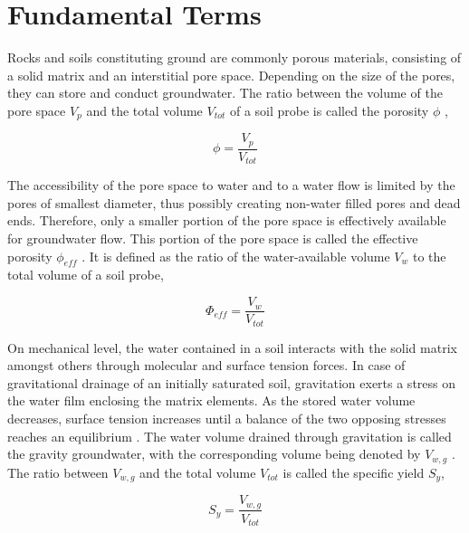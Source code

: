 


\section{Fundamental Terms}
\label{Sec-TheoFundTerms}

Rocks and soils constituting ground are commonly porous materials, consisting of a solid matrix and an interstitial pore space. 
Depending on the size of the pores, they can store and conduct groundwater. 
The ratio between the volume of the pore space $V_p$ and the total volume $V_{tot}$ of a soil probe is called the porosity $\phi$ \parencite{Fetter.2001},

\begin{equation}
    \label{Eq-Porosity}
    \phi = \frac{V_p}{V_{tot}}
\end{equation}

The accessibility of the pore space to water and to a water flow is limited by the pores of smallest diameter, thus possibly creating non-water filled pores and dead ends. 
Therefore, only a smaller portion of the pore space is effectively available for groundwater flow. 
This portion of the pore space is called the effective porosity $\phi_{eff}$ \parencite{Fetter.2001}. 
It is defined as the ratio of the water-available volume $V_w$ to the total volume of a soil probe,

\begin{equation}
    \label{Eq-PorEff}
    \Phi_{eff} = \frac{V_w}{V_{tot}}
\end{equation}

On mechanical level, the water contained in a soil interacts with the solid matrix amongst others through molecular and surface tension forces. 
In case of gravitational drainage of an initially saturated soil, gravitation exerts a stress on the water film enclosing the matrix elements. 
As the stored water volume decreases, surface tension increases until a balance of the two opposing stresses reaches an equilibrium \parencite{Fetter.2001}. 
The water volume drained through gravitation is called the gravity groundwater, with the corresponding volume being denoted by $V_{w,g}$ \parencite{Johnson.1967}. 
The ratio between $V_{w,g}$ and the total volume $V_{tot}$ is called the specific yield $S_y$,

\begin{equation}
    \label{Eq-Sy}
    S_y = \frac{V_{w,g}}{V_{tot}}
\end{equation}

